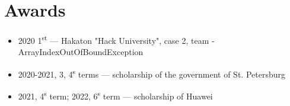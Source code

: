 \documentclass[letter]{deedy-resume}
\begin{document}
\begin{minipage}[t]{0.6\textwidth}
        \sectionspace %


        \section{Awards}

        \begin{itemize}[leftmargin=1em]
            \setlength\itemsep{0em}
            \item 2020 1\textsuperscript{st} --- Hakaton "Hack University", case 2, team - ArrayIndexOutOfBoundException
            \item 2020-2021, {3, 4}\textsuperscript{s} terms --- scholarship of the government of St. Petersburg
            \item 2021, 4\textsuperscript{s} term; 2022, 6\textsuperscript{s} term --- scholarship of Huawei
        \end{itemize}

        \sectionspace %

    \end{minipage} %
\end{document}
